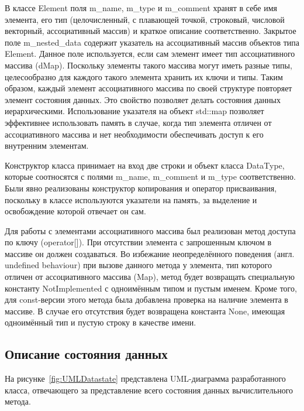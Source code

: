 В классе \textsf{Element} поля \textsf{m_name}, \textsf{m_type} и \textsf{m_comment} хранят в себе имя элемента, его тип (целочисленный, с плавающей точкой, строковый, числовой векторный, ассоциативный массив) и краткое описание соответственно. Закрытое поле \textsf{m_nested_data} содержит указатель на ассоциативный массив объектов типа Element. Данное поле используется, если сам элемент имеет тип ассоциативного массива (\textsf{dMap}). Поскольку элементы такого массива могут иметь разные типы, целесообразно для каждого такого элемента хранить их ключи и типы. Таким образом, каждый элемент ассоциативного массива по своей структуре повторяет элемент состояния данных. Это свойство позволяет делать состояния данных иерархическими. Использование указателя на объект std::map позволяет эффективнее использовать память в случае, когда тип элемента отличен от ассоциативного массива и нет необходимости обеспечивать доступ к его внутренним элементам.

Конструктор класса принимает на вход две строки и объект класса DataType, которые соотносятся с полями \textsf{m_name}, \textsf{m_comment} и \textsf{m_type} соответственно. Были явно реализованы конструктор копирования и оператор присваивания, поскольку в классе используются указатели на память, за выделение и освобождение которой отвечает он сам.

Для работы с элементами ассоциативного массива был реализован метод доступа по ключу (\textsf{operator[]}). При отсутствии элемента с запрошенным ключом в массиве он должен создаваться. Во избежание неопределённого поведения (англ. undefined behaviour) при вызове данного метода у элемента, тип которого отличен от ассоциативного массива (\textsf{Map}), метод будет возвращать специальную константу NotImplemented с одноимённым типом и пустым именем. Кроме того, для const-версии этого метода была добавлена проверка на наличие элемента в массиве. В случае его отсутствия будет возвращена константа None, имеющая одноимённый тип и пустую строку в качестве имени.

\subsection{Описание состояния данных}

На рисунке~\ref{fig:UMLDatastate} представлена UML-диаграмма разработанного класса, отвечающего за представление всего состояния данных вычислительного метода.

